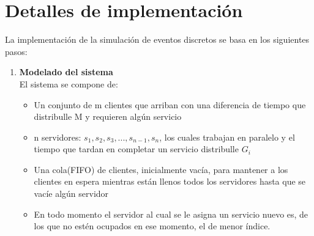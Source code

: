 \documentclass[article]{amsart}
\begin{document}
\section{Detalles de implementaci\'on}
La implementación de la simulación de eventos discretos se basa en los siguientes pasos:

    
\begin{enumerate}
\item \textbf{Modelado del sistema}\\
El sistema se compone de:
\begin{itemize}
\item Un conjunto de m clientes que arriban con una diferencia de tiempo que distribulle M y requieren alg\'un servicio\\
\item n servidores: $s_{1}, s_{2}, s_{3}, ..., s_{n-1}, s_{n}$, los cuales trabajan en paralelo y el tiempo que tardan en completar un servicio distribulle $G_{i}$\\
\item Una cola(FIFO) de clientes, inicialmente vac\'ia, para mantener a los clientes en espera mientras est\'an llenos todos los servidores hasta que se vac\'ie alg\'un servidor\\
\item En todo momento el servidor al cual se le asigna un servicio nuevo es, de los que no est\'en ocupados en ese momento, el de menor \'indice.\\
\end{itemize}


\end{enumerate}
\end{document}
